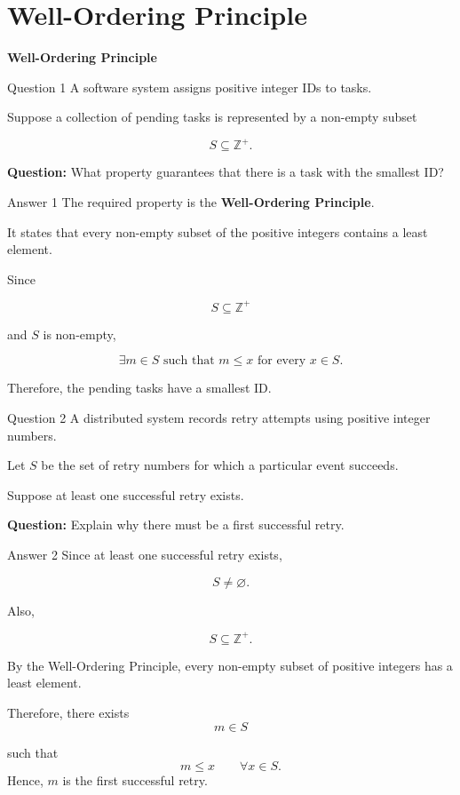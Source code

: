 \section{Well-Ordering Principle}

\begin{frame}
\centering
\Huge\textbf{Well-Ordering Principle}
\end{frame}


\begin{frame}{Question 1}
A software system assigns positive integer IDs to tasks.

Suppose a collection of pending tasks is represented by a non-empty subset

$$
S\subseteq\mathbb{Z}^+.
$$

\textbf{Question:} What property guarantees that there is a task with the smallest ID?
\end{frame}

\begin{frame}{Answer 1}
The required property is the \textbf{Well-Ordering Principle}.

It states that every non-empty subset of the positive integers contains a least element.

Since

$$
S\subseteq\mathbb{Z}^+
$$

and $S$ is non-empty,

$$
\boxed{\exists m\in S\text{ such that }m\leq x
\text{ for every }x\in S.}
$$

Therefore, the pending tasks have a smallest ID.
\end{frame}


\begin{frame}{Question 2}
A distributed system records retry attempts using positive integer numbers.

Let $S$ be the set of retry numbers for which a particular event succeeds.

Suppose at least one successful retry exists.

\textbf{Question:} Explain why there must be a first successful retry.
\end{frame}

\begin{frame}{Answer 2}
Since at least one successful retry exists,

$$
S\neq\varnothing.
$$

Also,

$$
S\subseteq\mathbb{Z}^+.
$$

By the Well-Ordering Principle, every non-empty subset of positive integers has a least element.

Therefore, there exists
$$
m\in S
$$

such that
$$
m\leq x
\qquad\forall x\in S.
$$
Hence, $m$ is the first successful retry.
\end{frame}

